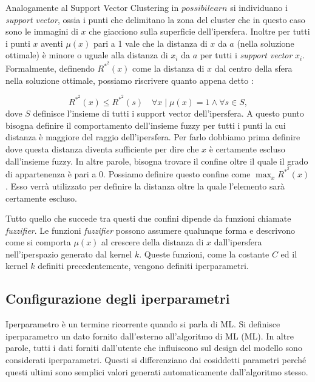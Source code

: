 \documentclass[12pt,italian]{report}
\begin{document}
Analogamente al Support Vector Clustering in $possibilearn$ si individuano i \emph{support vector}, ossia i punti che delimitano la zona del cluster che in questo caso sono le immagini di $x $ che giacciono sulla superficie dell'ipersfera. Inoltre per tutti i punti $x$ aventi $ \mu(x) $ pari a 1 vale che la distanza di $x$ da $a$ (nella soluzione ottimale) è minore o uguale alla distanza di $x_{i}$ da $a$ per tutti i \emph{support vector} $x_{i}$.
Formalmente, definendo $ R^{*^2}(x) $ come la distanza di $x$ dal centro della sfera nella soluzione ottimale, possiamo riscrivere quanto appena detto :

\[ R^{*^2}(x) \leq R^{*^2}(s) \quad \forall x \mid \mu(x) = 1 \wedge \forall s \in S, \]
dove $S$ definisce l'insieme di tutti i support vector dell'ipersfera.
A questo punto bisogna definire il comportamento dell'insieme fuzzy per tutti i punti la cui distanza è maggiore del raggio dell'ipersfera. Per farlo dobbiamo prima definire dove questa distanza diventa sufficiente per dire che $x$ è certamente escluso dall'insieme fuzzy. In altre parole, bisogna trovare il confine oltre il quale il grado di appartenenza è pari a $0$. Possiamo definire questo confine come $\max_{x} R^{*^2}(x)$.
Esso verrà utilizzato per definire la distanza oltre la quale l'elemento sarà certamente escluso.

Tutto quello che succede tra questi due confini dipende da funzioni chiamate \emph{fuzzifier}. Le funzioni \emph{fuzzifier} possono assumere qualunque forma e descrivono come si comporta $ \mu(x) $ al crescere della distanza di $x$ dall'ipersfera nell'iperspazio generato dal kernel $k$. Queste funzioni, come la costante $C$ ed il kernel $k$ definiti precedentemente, vengono definiti iperparametri. 


\subsection{Configurazione degli iperparametri}

Iperparametro è un termine ricorrente quando si parla di ML. Si definisce iperparametro un dato fornito dall'esterno all'algoritmo di ML (ML). In altre parole, tutti i dati forniti dall'utente che influiscono sul design del modello sono considerati iperparametri. Questi si differenziano dai cosiddetti parametri perché questi ultimi sono semplici valori generati automaticamente dall'algoritmo stesso.
\end{document}

